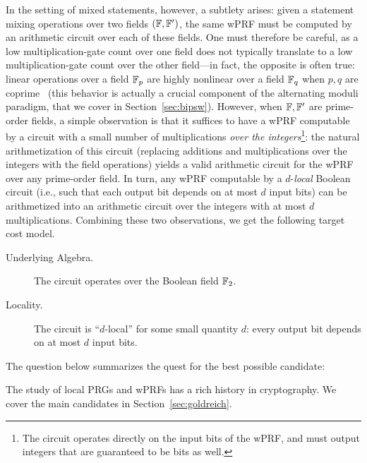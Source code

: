 In the setting of mixed statements, however, a subtlety arises: given a statement mixing operations over two fields $(\mathbb{F},\mathbb{F}')$, the same wPRF must be computed by an arithmetic circuit over each of these fields. One must therefore be careful, as a low multiplication-gate count over one field does not typically translate to a low multiplication-gate count over the other field---in fact, the opposite is often true: linear operations over a field $\mathbb{F}_p$ are highly nonlinear over a field $\mathbb{F}_q$ when $p,q$ are coprime~\cite{Raz87,Smo87} (this behavior is actually a crucial component of the alternating moduli paradigm, that we cover in Section~\ref{sec:bipsw}). However, when $\mathbb{F},\mathbb{F}'$ are prime-order fields, a simple observation is that it suffices to have a wPRF computable by a circuit with a small number of multiplications \emph{over the integers}\footnote{The circuit operates directly on the input bits of the wPRF, and must output integers that are guaranteed to be bits as well.}: the natural arithmetization of this circuit (replacing additions and multiplications over the integers with the field operations) yields a valid arithmetic circuit for the wPRF over any prime-order field.
 In turn, any wPRF computable by a $d$-\emph{local} Boolean circuit (i.e., such that each output bit depends on at most $d$ input bits) can be arithmetized into an arithmetic circuit over the integers with at most $d$ multiplications. Combining these two observations, we get the following target cost model.
 \begin{description}
\item[Underlying Algebra.] The circuit operates over the Boolean field $\mathbb{F}_2$.
\item[Locality.] The circuit is ``$d$-local'' for some small quantity $d$: every output bit depends on at most $d$ input bits.
\end{description}

The question below summarizes the quest for the best possible candidate:


The study of local PRGs and wPRFs has a rich history in cryptography. We cover the main candidates in Section~\ref{sec:goldreich}.



